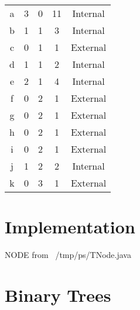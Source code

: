 \documentclass[a4paper, 9pt]{extarticle}
\begin{document}
\begin{center}
  \begin{tabular}{|c|c|c|c|c|}
    \hline
    a & 3 & 0 & 11 & Internal \\
    b & 1 & 1 & 3  & Internal \\
    c & 0 & 1 & 1  & External \\
    \hline
    d & 1 & 1 & 2 & Internal \\
    e & 2 & 1 & 4 & Internal \\
    f & 0 & 2 & 1 & External \\
    \hline
    g & 0 & 2 & 1 & External \\
    h & 0 & 2 & 1 & External \\
    i & 0 & 2 & 1 & External \\
    \hline
    j & 1 & 2 & 2 & Internal \\
    k & 0 & 3 & 1 & External \\
    \hline
  \end{tabular}
\end{center}



\section{Implementation}

NODE from ~/tmp/ps/TNode.java





\section{Binary Trees}
\end{document}
